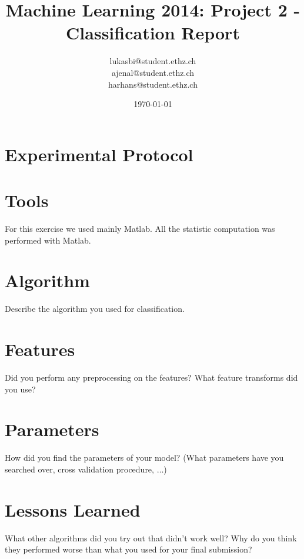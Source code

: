 \documentclass[a4paper, 11pt]{article}
\title{Machine Learning 2014: Project 2 - Classification Report}
\author{lukasbi@student.ethz.ch\\ ajenal@student.ethz.ch\\ harhans@student.ethz.ch\\}
\date{\today}
\begin{document}
\maketitle

\section*{Experimental Protocol}

\section{Tools}
For this exercise we used mainly Matlab. All the statistic computation was performed with Matlab. 

\section{Algorithm}
Describe the algorithm you used for classification.

\section{Features}
Did you perform any preprocessing on the features? What feature transforms did you use?


\section{Parameters}
How did you find the parameters of your model? (What parameters have you searched over, cross validation procedure, $\ldots$)


\section{Lessons Learned} What other algorithms did you try out that didn't work well?
Why do you think they performed worse than what you used for your final submission?

\end{document}
